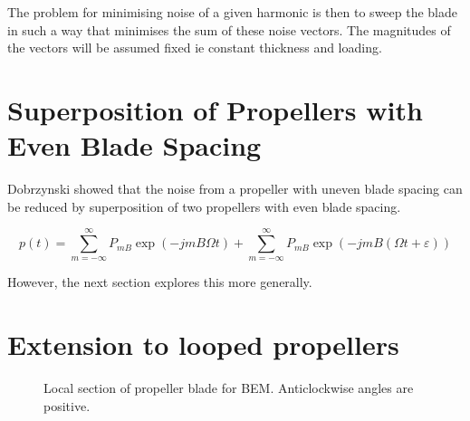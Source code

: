 \documentclass[8pt]{article}
\begin{document}
The problem for minimising noise of a given harmonic is then to sweep the blade in such a way that minimises the sum of these noise vectors.
The magnitudes of the vectors will be assumed fixed ie constant thickness and loading.


\section{Superposition of Propellers with Even Blade Spacing}

Dobrzynski \cite{uneven_blade_spacing} showed that the noise from a propeller with uneven blade spacing can be reduced by superposition of two propellers with even blade spacing.

\begin{equation}
    p(t) = \sum_{m=-\infty}^\infty P_{mB} \exp(-jmB\Omega t) + \sum_{m=-\infty}^\infty P_{mB} \exp(-jmB(\Omega t + \varepsilon))
    \label{eq:Dobrzynski}
\end{equation}

However, the next section explores this more generally.

\section{Extension to looped propellers}

\begin{figure}[H]
    \centering
    \caption{Local section of propeller blade for BEM. Anticlockwise angles are positive.}
    \label{fig:waffler}
\end{figure}
\end{document}

